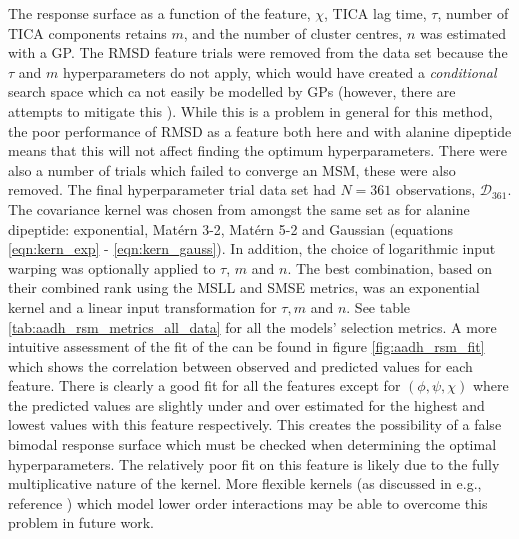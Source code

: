 The response surface as a function of the feature, $\chi$, TICA lag time, $\tau$, number of TICA components retains $m$, and the number of cluster centres, $n$ was estimated with a GP. The RMSD feature trials were removed from the data set because the $\tau$ and $m$ hyperparameters do not apply, which would have created a \emph{conditional} search space \cite{bergstraAlgorithmsHyperParameterOptimizationa} which  ca not easily be modelled by GPs (however, there are attempts to mitigate this \cite{swerskyRaidersLostArchitecture2014}). While this is a problem in general for this method, the poor performance of RMSD as a feature both here and with alanine dipeptide means that this will not affect finding the optimum hyperparameters. There were also a number of trials which failed to converge an MSM, these were also removed. The final hyperparameter trial data set had $N=361$ observations, $\mathcal{D}_{361}$. 
The covariance kernel was chosen from amongst the same set as for alanine dipeptide: exponential, Mat\'{e}rn 3-2, Mat\'{e}rn 5-2 and  Gaussian (equations \ref{eqn:kern_exp} - \ref{eqn:kern_gauss}). In addition, the choice of logarithmic  input warping was optionally applied to $\tau$, $m$ and $n$. The best combination, based on their combined rank using the MSLL and SMSE metrics, was an exponential kernel and a linear input transformation for $\tau, m$ and $n$. See table \ref{tab:aadh_rsm_metrics_all_data} for  all the models' selection metrics. A more intuitive assessment of the fit of the can be found in figure  \ref{fig:aadh_rsm_fit} which shows the correlation between observed and predicted values for each feature. There is clearly a good fit for all the features except for $(\phi, \psi, \chi)$ where the predicted values are slightly under and over estimated for the highest and lowest values with this feature respectively. This creates the possibility of a false bimodal response surface which must be checked when determining the optimal hyperparameters.  The relatively poor fit on this feature is likely due to the fully multiplicative nature of the kernel. More flexible kernels (as discussed in e.g., reference \cite{duvenaud2011additive}) which model lower order interactions may be able to overcome this problem in future work. 

